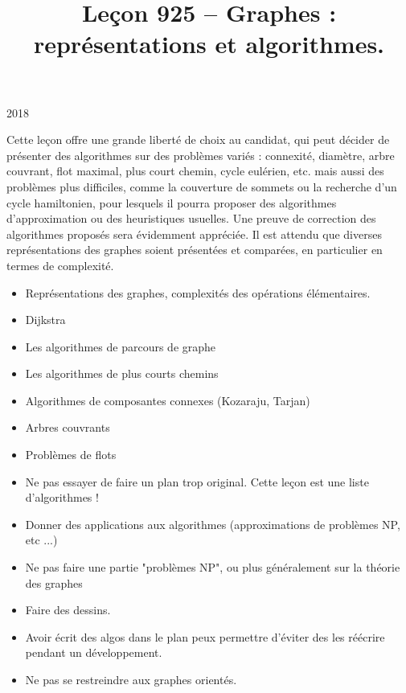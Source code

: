 \documentclass{agregfiche}
\title{Leçon 925 -- Graphes : représentations et algorithmes.}
\begin{document}
\maketitle

\secrapports

\begin{rapport}{2018}

Cette leçon offre une grande liberté de choix au candidat, qui peut décider de présenter des algorithmes sur des problèmes variés : connexité, diamètre, arbre couvrant, flot maximal, plus court chemin, cycle eulérien, etc. mais aussi des problèmes plus difficiles, comme la couverture de sommets ou la recherche d’un cycle hamiltonien, pour lesquels il pourra proposer des algorithmes d’approximation ou des heuristiques usuelles. Une preuve de correction des algorithmes proposés sera évidemment appréciée. Il est attendu que diverses représentations des graphes soient présentées et comparées, en particulier en termes de complexité.

\end{rapport}

\secindispensables

\begin{itemize}
    \item Représentations des graphes, complexités des opérations élémentaires.
    \item Dijkstra

\end{itemize}

\secasavoir
\begin{itemize}
	\item Les algorithmes de parcours de graphe
	\item Les algorithmes de plus courts chemins
\end{itemize}
\secidees

\begin{itemize}
	\item Algorithmes de composantes connexes (Kozaraju, Tarjan)
	\item Arbres couvrants
	\item Problèmes de flots
\end{itemize}

\secpieges

\begin{itemize}
    \item Ne pas essayer de faire un plan trop original. Cette leçon est une liste d'algorithmes !
    \item Donner des applications aux algorithmes (approximations de problèmes NP, etc ...)
    \item Ne pas faire une partie "problèmes NP", ou plus généralement sur la théorie des graphes
    \item Faire des dessins.
    \item Avoir écrit des algos dans le plan peux permettre d'éviter des les réécrire pendant un développement.
    \item Ne pas se restreindre aux graphes orientés.
\end{itemize}
\end{document}
